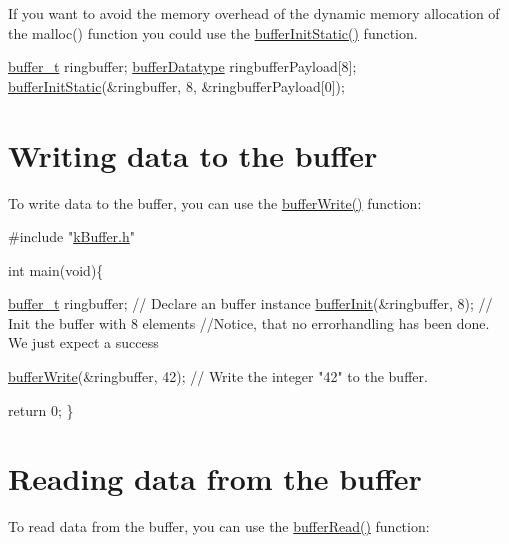  If you want to avoid the memory overhead of the dynamic memory allocation of the malloc() function you could use the \hyperlink{k_buffer_8c_a8da8904eb3cb9b87699cf0f45ce5bf51}{buffer\+Init\+Static()} function. 
\begin{DoxyCode}
\hyperlink{structbuffer__t}{buffer\_t} ringbuffer;
\hyperlink{k_buffer_8h_ae8d6ebfbda34ebc2e00138c04b46e9b1}{bufferDatatype} ringbufferPayload[8];
\hyperlink{k_buffer_8c_a8da8904eb3cb9b87699cf0f45ce5bf51}{bufferInitStatic}(&ringbuffer, 8, &ringbufferPayload[0]);
\end{DoxyCode}
 \hypertarget{fundamental_usage_write}{}\section{Writing data to the buffer}\label{fundamental_usage_write}
To write data to the buffer, you can use the \hyperlink{k_buffer_8c_a9d6410a89adf65a3ef12340ecb9bbd55}{buffer\+Write()} function\+: 
\begin{DoxyCode}
\textcolor{preprocessor}{#include "\hyperlink{k_buffer_8h}{kBuffer.h}"}

\textcolor{keywordtype}{int} main(\textcolor{keywordtype}{void})\{

 \hyperlink{structbuffer__t}{buffer\_t} ringbuffer;            \textcolor{comment}{// Declare an buffer instance}
 \hyperlink{k_buffer_8c_aec18d6ea571b1326dbeb7ca15f4969c0}{bufferInit}(&ringbuffer, 8);     \textcolor{comment}{// Init the buffer with 8 elements}
 \textcolor{comment}{//Notice, that no errorhandling has been done. We just expect a success}
 
 \hyperlink{k_buffer_8c_a9d6410a89adf65a3ef12340ecb9bbd55}{bufferWrite}(&ringbuffer, 42);   \textcolor{comment}{// Write the integer "42" to the buffer.}

 \textcolor{keywordflow}{return} 0;
\}
\end{DoxyCode}
 \hypertarget{fundamental_usage_read}{}\section{Reading data from the buffer}\label{fundamental_usage_read}
To read data from the buffer, you can use the \hyperlink{k_buffer_8c_a9b80be9033ccd6b5a101f811520ab4cc}{buffer\+Read()} function\+: 
